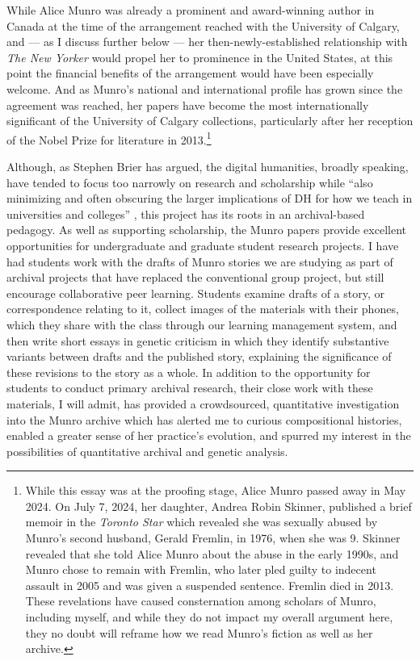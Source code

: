 \documentclass{article}
\begin{document}
While Alice Munro was already a prominent and award-winning author in
Canada at the time of the arrangement reached with the University of
Calgary, and –– as I discuss further below –– her then-newly-established
relationship with \emph{The New Yorker} would propel her to prominence
in the United States, at this point the financial benefits of the
arrangement would have been especially welcome. And as Munro's national
and international profile has grown since the agreement was reached, her
papers have become the most internationally significant of the
University of Calgary collections, particularly after her reception of
the Nobel Prize for literature in 2013.\footnote{While this essay was at the proofing stage, Alice Munro passed away in May 2024. On July 7, 2024, her daughter, Andrea Robin Skinner, published a brief memoir in the \emph{Toronto Star} which revealed she was sexually abused by Munro’s second husband, Gerald Fremlin, in 1976, when she was 9. Skinner revealed that she told Alice Munro about the abuse in the early 1990s, and Munro chose to remain with Fremlin, who later pled guilty to indecent assault in 2005 and was given a suspended sentence. Fremlin died in 2013. These revelations have caused consternation among scholars of Munro, including myself, and while they do not impact my overall argument here, they no doubt will reframe how we read Munro’s fiction as well as her archive.}

Although, as Stephen Brier has argued, the digital humanities, broadly
speaking, have tended to focus too narrowly on research and scholarship
while ``also minimizing and often obscuring the larger implications of
DH for how we teach in universities and colleges'' \citep[391]{brier_wheres_2012}, this
project has its roots in an archival-based pedagogy. As well as
supporting scholarship, the Munro papers provide excellent opportunities
for undergraduate and graduate student research projects. I have had
students work with the drafts of Munro stories we are studying as part
of archival projects that have replaced the conventional group project,
but still encourage collaborative peer learning. Students examine drafts
of a story, or correspondence relating to it, collect images of the
materials with their phones, which they share with the class through our
learning management system, and then write short essays in genetic
criticism in which they identify substantive variants between drafts
and the published story, explaining the significance of these revisions
to the story as a whole. In addition to the opportunity for students to
conduct primary archival research, their close work with these
materials, I will admit, has provided a crowdsourced, quantitative
investigation into the Munro archive which has alerted me to curious
compositional histories, enabled a greater sense of her practice's
evolution, and spurred my interest in the possibilities of quantitative
archival and genetic analysis.
\end{document}

